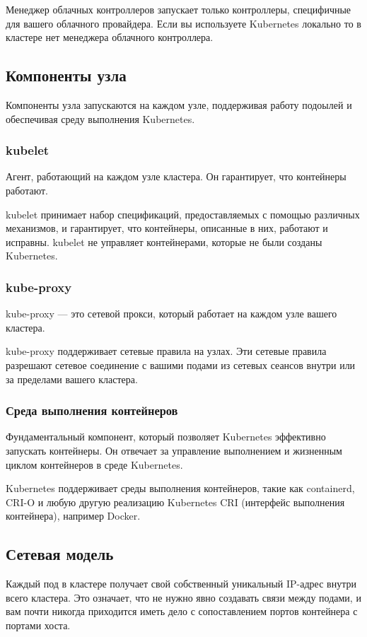 \documentclass[a4page]{article}
\begin{document}
Менеджер облачных контроллеров запускает только контроллеры, специфичные для вашего облачного провайдера. Если вы используете Kubernetes локально то в кластере нет менеджера облачного контроллера.

\subsection{Компоненты узла}
Компоненты узла запускаются на каждом узле, поддерживая работу подоылей и обеспечивая среду выполнения Kubernetes\cite{k8s:n-components}.

\subsubsection{kubelet}
Агент, работающий на каждом узле кластера. Он гарантирует, что контейнеры работают.

kubelet принимает набор спецификаций, предоставляемых с помощью различных механизмов, и гарантирует, что контейнеры, описанные в них, работают и исправны. kubelet не управляет контейнерами, которые не были созданы Kubernetes.

\subsubsection{kube-proxy}
kube-proxy --- это сетевой прокси, который работает на каждом узле вашего кластера.

kube-proxy поддерживает сетевые правила на узлах. Эти сетевые правила разрешают сетевое соединение с вашими подами из сетевых сеансов внутри или за пределами вашего кластера.

\subsubsection{Среда выполнения контейнеров}
Фундаментальный компонент, который позволяет Kubernetes эффективно \\запускать контейнеры. Он отвечает за управление выполнением и жизненным циклом контейнеров в среде Kubernetes.

Kubernetes поддерживает среды выполнения контейнеров, такие как containerd, CRI-O и любую другую реализацию Kubernetes CRI (интерфейс выполнения контейнера), например Docker.

\subsection{Сетевая модель}
Каждый под в кластере получает свой собственный уникальный IP-адрес внутри всего кластера. Это означает, что не нужно явно создавать связи между подами, и вам почти никогда приходится иметь дело с сопоставлением портов контейнера с портами хоста\cite{k8s:network-model}.
\end{document}
